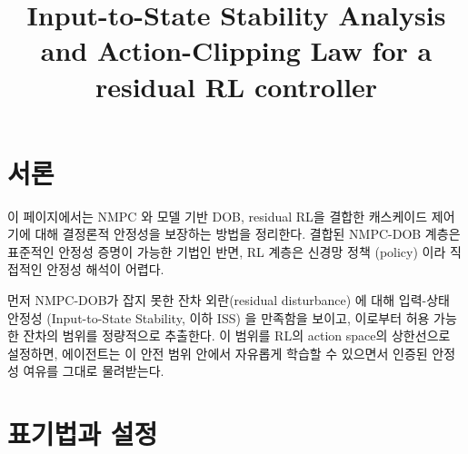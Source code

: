 \documentclass[
  11pt,
]{article}
\title{Input-to-State Stability Analysis and Action-Clipping Law for a
residual RL controller}
\author{}
\date{}
\renewcommand*\contentsname{Table of contents}
\newcommand\contentsname{Table of contents}
\theoremstyle{plain}
\theoremstyle{plain}
\theoremstyle{definition}
\theoremstyle{remark}
\begin{document}
\maketitle

\renewcommand*\contentsname{Table of contents}
{
\setcounter{tocdepth}{3}
\tableofcontents
}

\section{서론}\label{sec-intro}

이 페이지에서는 NMPC 와 모델 기반 DOB, residual RL을 결합한 캐스케이드
제어기에 대해 결정론적 안정성을 보장하는 방법을 정리한다. 결합된
NMPC-DOB 계층은 표준적인 안정성 증명이 가능한 기법인 반면, RL 계층은
신경망 정책 (policy) 이라 직접적인 안정성 해석이 어렵다.

먼저 NMPC-DOB가 잡지 못한 잔차 외란(residual disturbance) 에 대해
입력-상태 안정성 (Input-to-State Stability, 이하 ISS) 을 만족함을
보이고, 이로부터 허용 가능한 잔차의 범위를 정량적으로 추출한다. 이
범위를 RL의 action space의 상한선으로 설정하면, 에이전트는 이 안전 범위
안에서 자유롭게 학습할 수 있으면서 인증된 안정성 여유를 그대로
물려받는다.

\section{표기법과 설정}\label{sec-setup}
\end{document}

